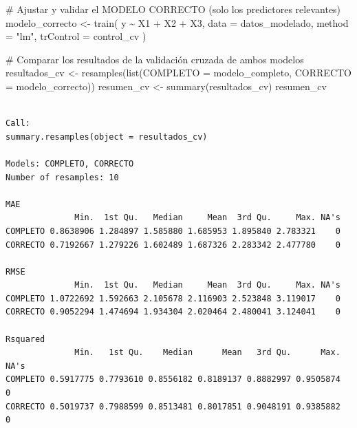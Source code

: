 \documentclass[
  letterpaper,
  DIV=11,
  numbers=noendperiod]{scrreprt}
\newenvironment{Shaded}{\begin{snugshade}}{\end{snugshade}}
\newcommand{\AttributeTok}[1]{\textcolor[rgb]{0.40,0.45,0.13}{#1}}
\newcommand{\CommentTok}[1]{\textcolor[rgb]{0.37,0.37,0.37}{#1}}
\newcommand{\DecValTok}[1]{\textcolor[rgb]{0.68,0.00,0.00}{#1}}
\newcommand{\FunctionTok}[1]{\textcolor[rgb]{0.28,0.35,0.67}{#1}}
\newcommand{\NormalTok}[1]{\textcolor[rgb]{0.00,0.23,0.31}{#1}}
\newcommand{\OtherTok}[1]{\textcolor[rgb]{0.00,0.23,0.31}{#1}}
\newcommand{\SpecialCharTok}[1]{\textcolor[rgb]{0.37,0.37,0.37}{#1}}
\newcommand{\StringTok}[1]{\textcolor[rgb]{0.13,0.47,0.30}{#1}}
\begin{document}
\begin{tcolorbox}
\begin{Shaded}
\begin{Highlighting}[]
\CommentTok{\# Ajustar y validar el MODELO CORRECTO (solo los predictores relevantes)}
\NormalTok{modelo\_correcto }\OtherTok{\textless{}{-}} \FunctionTok{train}\NormalTok{(}
\NormalTok{  y }\SpecialCharTok{\textasciitilde{}}\NormalTok{ X1 }\SpecialCharTok{+}\NormalTok{ X2 }\SpecialCharTok{+}\NormalTok{ X3, }
  \AttributeTok{data =}\NormalTok{ datos\_modelado, }
  \AttributeTok{method =} \StringTok{"lm"}\NormalTok{,}
  \AttributeTok{trControl =}\NormalTok{ control\_cv}
\NormalTok{)}

\CommentTok{\# Comparar los resultados de la validación cruzada de ambos modelos}
\NormalTok{resultados\_cv }\OtherTok{\textless{}{-}} \FunctionTok{resamples}\NormalTok{(}\FunctionTok{list}\NormalTok{(}\AttributeTok{COMPLETO =}\NormalTok{ modelo\_completo, }\AttributeTok{CORRECTO =}\NormalTok{ modelo\_correcto))}
\NormalTok{resumen\_cv }\OtherTok{\textless{}{-}} \FunctionTok{summary}\NormalTok{(resultados\_cv)}
\NormalTok{resumen\_cv}
\end{Highlighting}
\end{Shaded}

\begin{verbatim}

Call:
summary.resamples(object = resultados_cv)

Models: COMPLETO, CORRECTO 
Number of resamples: 10 

MAE 
              Min.  1st Qu.   Median     Mean  3rd Qu.     Max. NA's
COMPLETO 0.8638906 1.284897 1.585880 1.685953 1.895840 2.783321    0
CORRECTO 0.7192667 1.279226 1.602489 1.687326 2.283342 2.477780    0

RMSE 
              Min.  1st Qu.   Median     Mean  3rd Qu.     Max. NA's
COMPLETO 1.0722692 1.592663 2.105678 2.116903 2.523848 3.119017    0
CORRECTO 0.9052294 1.474694 1.934304 2.020464 2.480041 3.124041    0

Rsquared 
              Min.   1st Qu.    Median      Mean   3rd Qu.      Max. NA's
COMPLETO 0.5917775 0.7793610 0.8556182 0.8189137 0.8882997 0.9505874    0
CORRECTO 0.5019737 0.7988599 0.8513481 0.8017851 0.9048191 0.9385882    0
\end{verbatim}

\begin{Shaded}
\end{Shaded}


\end{tcolorbox}
\end{document}
